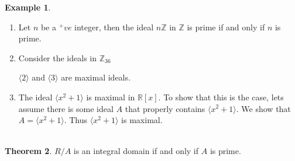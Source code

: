 \documentclass[11pt,a4paper]{article}
\theoremstyle{definition}
\newtheorem{thm}{Theorem}[subsection]
\newtheorem{exa}[thm]{Example}
\begin{document}
\begin{exa}
\begin{enumerate}
\item Let $n$ be a $^+ve$ integer, then the ideal $n\mathbb{Z}$ in $\mathbb{Z}$ is prime if and only if $n$ is prime.


\item Consider the ideals in $\mathbb{Z}_{36}$









\begin{figure}[H]
\centering
{}
\end{figure}


















$\langle 2\rangle$ and $\langle 3\rangle$ are maximal ideals.

\item The ideal $\langle x^2 + 1\rangle$ is maximal in $\mathbb{R}[x]$. To show that this is the case, lets assume there is some ideal $A$ that properly contains $\langle x^2 + 1\rangle$. We show that $A = \langle x^2 + 1\rangle$. Thus $\langle x^2 + 1\rangle$ is maximal.\\\\
\end{enumerate}
\end{exa}






\begin{thm}
$R/A$ is an integral domain if and only if $A$ is prime.\\
\end{thm}
\end{document}
